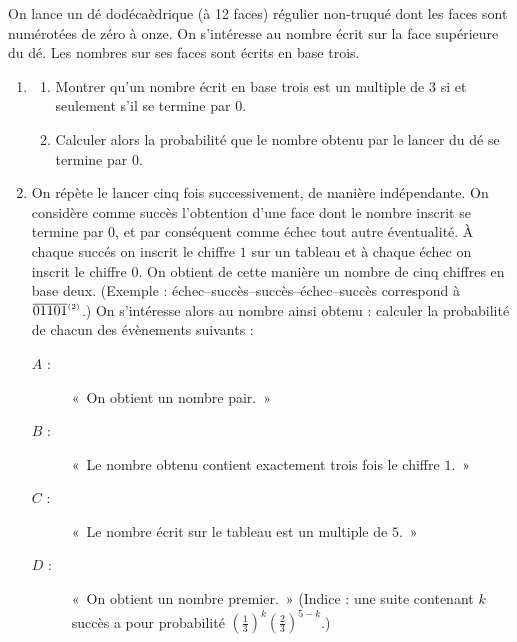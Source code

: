 \begin{exo}
	On lance un d\'e dod\'eca\`edrique (\`a 12 faces) r\'egulier non-truqu\'e dont 
	les faces sont num\'erot\'ees de z\'ero \`a onze.
	On s'int\'eresse au nombre \'ecrit sur la face sup\'erieure du d\'e.
	Les nombres sur ses faces sont \'ecrits en base trois.
	\begin{enumerate}
		\item 
			\begin{enumerate}
				\item Montrer qu'un nombre \'ecrit en base trois est un multiple de $3$ si et seulement s'il se termine par $0$.
				\item Calculer alors la probabilit\'e que le nombre obtenu par le lancer du d\'e se termine par $0$.
			\end{enumerate}
		\item On r\'ep\`ete le lancer cinq fois successivement, de mani\`ere ind\'ependante.
			On consid\`ere comme succ\`es l'obtention d'une face dont le nombre inscrit se termine par $0$,
			et par cons\'equent comme \'echec tout autre \'eventualit\'e.
			\`A chaque succ\'es on inscrit le chiffre $1$ sur un tableau et \`a chaque \'echec on inscrit le chiffre $0$.
			On obtient de cette mani\`ere un nombre de cinq chiffres en base deux.
			(Exemple : \'echec--succ\`es--succ\`es--\'echec--succ\`es correspond \`a $\overline{01101}^{_{(2)}}$.)
			On s'int\'eresse alors au nombre ainsi obtenu :
			calculer la probabilit\'e de chacun des \'ev\`enements suivants :
			\begin{description}
				\item[$A$ :] «~On obtient un nombre pair.~»
				\item[$B$ :] «~Le nombre obtenu contient exactement trois fois le chiffre $1$.~»
				\item[$C$ :] «~Le nombre \'ecrit sur le tableau est un multiple de $5$.~»
				\item[$D$ :] «~On obtient un nombre premier.~»
				(Indice : une suite contenant $k$ succ\`es a pour probabilit\'e
				$\left(\frac{1}{3}\right)^k\left(\frac{2}{3}\right)^{5-k}$.)
			\end{description}
	\end{enumerate}
\end{exo}


